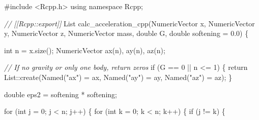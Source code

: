 \documentclass[
  10.5pt,
  letterpaper,
]{scrbook}
\newenvironment{Shaded}{\begin{snugshade}}{\end{snugshade}}
\newcommand{\CommentTok}[1]{\textcolor[rgb]{0.00,0.00,0.00}{\textit{#1}}}
\newcommand{\ControlFlowTok}[1]{\textcolor[rgb]{0.00,0.00,0.00}{#1}}
\newcommand{\DataTypeTok}[1]{\textcolor[rgb]{0.00,0.00,0.00}{#1}}
\newcommand{\DecValTok}[1]{\textcolor[rgb]{0.00,0.00,0.00}{#1}}
\newcommand{\FloatTok}[1]{\textcolor[rgb]{0.00,0.00,0.00}{#1}}
\newcommand{\ImportTok}[1]{\textcolor[rgb]{0.00,0.00,0.00}{#1}}
\newcommand{\KeywordTok}[1]{\textcolor[rgb]{0.00,0.00,0.00}{#1}}
\newcommand{\NormalTok}[1]{\textcolor[rgb]{0.00,0.00,0.00}{#1}}
\newcommand{\OperatorTok}[1]{\textcolor[rgb]{0.00,0.00,0.00}{#1}}
\newcommand{\PreprocessorTok}[1]{\textcolor[rgb]{0.00,0.00,0.00}{#1}}
\newcommand{\StringTok}[1]{\textcolor[rgb]{0.00,0.00,0.00}{#1}}
\theoremstyle{plain}
\theoremstyle{remark}
\begin{document}
\begin{Shaded}
\begin{Highlighting}[]
\PreprocessorTok{\#include }\ImportTok{\textless{}Rcpp.h\textgreater{}}
\KeywordTok{using} \KeywordTok{namespace}\NormalTok{ Rcpp}\OperatorTok{;}

\CommentTok{// [[Rcpp::export]]}
\NormalTok{List calc\_acceleration\_cpp}\OperatorTok{(}\NormalTok{NumericVector x}\OperatorTok{,}\NormalTok{ NumericVector y}\OperatorTok{,}\NormalTok{ NumericVector z}\OperatorTok{,}
\NormalTok{                           NumericVector mass}\OperatorTok{,} \DataTypeTok{double}\NormalTok{ G}\OperatorTok{,}
                           \DataTypeTok{double}\NormalTok{ softening }\OperatorTok{=} \FloatTok{0.0}\OperatorTok{)} \OperatorTok{\{}

  \DataTypeTok{int}\NormalTok{ n }\OperatorTok{=}\NormalTok{ x}\OperatorTok{.}\NormalTok{size}\OperatorTok{();}
\NormalTok{  NumericVector ax}\OperatorTok{(}\NormalTok{n}\OperatorTok{),}\NormalTok{ ay}\OperatorTok{(}\NormalTok{n}\OperatorTok{),}\NormalTok{ az}\OperatorTok{(}\NormalTok{n}\OperatorTok{);}

  \CommentTok{// If no gravity or only one body, return zeros}
  \ControlFlowTok{if} \OperatorTok{(}\NormalTok{G }\OperatorTok{==} \DecValTok{0} \OperatorTok{||}\NormalTok{ n }\OperatorTok{\textless{}=} \DecValTok{1}\OperatorTok{)} \OperatorTok{\{}
    \ControlFlowTok{return}\NormalTok{ List}\OperatorTok{::}\NormalTok{create}\OperatorTok{(}\NormalTok{Named}\OperatorTok{(}\StringTok{"ax"}\OperatorTok{)} \OperatorTok{=}\NormalTok{ ax}\OperatorTok{,}\NormalTok{ Named}\OperatorTok{(}\StringTok{"ay"}\OperatorTok{)} \OperatorTok{=}\NormalTok{ ay}\OperatorTok{,}\NormalTok{ Named}\OperatorTok{(}\StringTok{"az"}\OperatorTok{)} \OperatorTok{=}\NormalTok{ az}\OperatorTok{);}
  \OperatorTok{\}}

  \DataTypeTok{double}\NormalTok{ eps2 }\OperatorTok{=}\NormalTok{ softening }\OperatorTok{*}\NormalTok{ softening}\OperatorTok{;}

  \ControlFlowTok{for} \OperatorTok{(}\DataTypeTok{int}\NormalTok{ j }\OperatorTok{=} \DecValTok{0}\OperatorTok{;}\NormalTok{ j }\OperatorTok{\textless{}}\NormalTok{ n}\OperatorTok{;}\NormalTok{ j}\OperatorTok{++)} \OperatorTok{\{}
    \ControlFlowTok{for} \OperatorTok{(}\DataTypeTok{int}\NormalTok{ k }\OperatorTok{=} \DecValTok{0}\OperatorTok{;}\NormalTok{ k }\OperatorTok{\textless{}}\NormalTok{ n}\OperatorTok{;}\NormalTok{ k}\OperatorTok{++)} \OperatorTok{\{}
      \ControlFlowTok{if} \OperatorTok{(}\NormalTok{j }\OperatorTok{!=}\NormalTok{ k}\OperatorTok{)} \OperatorTok{\{}


\end{Highlighting}
\end{Shaded}
\end{document}
